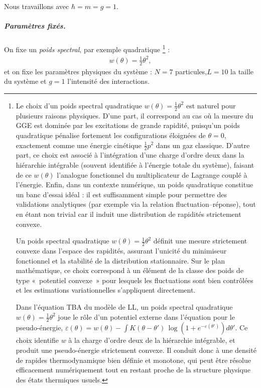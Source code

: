 Nous travaillons avec $ \hbar = m = g = 1 $.
\subparagraph{Paramètres fixés.}
On fixe un {\em poids spectral}, par exemple quadratique
\footnote{Le choix d’un poids spectral quadratique $w(\theta)=\tfrac12 \theta^2$ est naturel pour plusieurs raisons physiques. D’une part, il correspond au cas où la mesure du \gls{GGE} est dominée par les excitations de grande rapidité, puisqu’un poids quadratique pénalise fortement les configurations éloignées de $\theta=0$, exactement comme une énergie cinétique \(\tfrac12 p^2\) dans un gaz classique. D’autre part, ce choix est associé à l’intégration d’une charge d’ordre deux dans la hiérarchie intégrable (souvent identifiée à l’énergie totale du système), faisant de ce $w(\theta)$ l’analogue fonctionnel du multiplicateur de Lagrange couplé à l’énergie. Enfin, dans un contexte numérique, un poids quadratique constitue un banc d’essai idéal : il est suffisamment simple pour permettre des validations analytiques (par exemple via la relation fluctuation–réponse), tout en étant non trivial car il induit une distribution de rapidités strictement convexe.

\smallskip

Un poids spectral quadratique $w(\theta)=\tfrac12\theta^2$ définit une mesure strictement convexe dans l’espace des rapidités, assurant l’unicité du minimiseur fonctionnel et la stabilité de la distribution stationnaire. Sur le plan mathématique, ce choix correspond à un élément de la classe des poids de type «~potentiel convexe~» pour lesquels les fluctuations sont bien contrôlées et les estimations variationnelles s’appliquent directement.

\smallskip

Dans l’équation \gls{TBA} du modèle de \gls{LL}, un poids spectral quadratique $w(\theta)=\tfrac12\theta^2$ joue le rôle d’un potentiel externe dans l’équation pour le pseudo-énergie, 
\(
\varepsilon(\theta)=w(\theta)-\int K(\theta-\theta')\,\log\!\left(1+e^{-\varepsilon(\theta')}\right)d\theta'.
\)
Ce choix identifie $w$ à la charge d’ordre deux de la hiérarchie intégrable, et produit une pseudo-énergie strictement convexe. Il conduit donc à une densité de rapides thermodynamique bien définie et monotone, qui peut être résolue efficacement numériquement tout en restant proche de la structure physique des états thermiques usuels.}
:
\begin{eqnarray}
	w(\theta) = \tfrac{1}{2} \theta^2,
\end{eqnarray}
et on fixe les paramètres physiques du système : \( N = 7 \) particules,\( L = 10 \) la taille du système et \( g = 1 \)  l’intensité des interactions.

